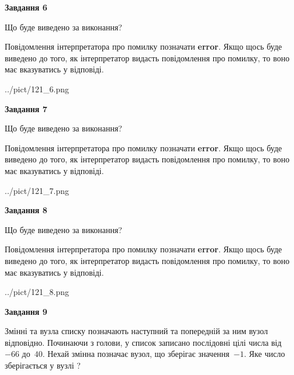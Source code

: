 \documentclass[12pt, ukrainian]{article}
\begin{document}
{\begin {large}
{\begin {center}\textbf{Завдання 6}\end {center}}\par
Що буде виведено за виконання?

Повідомлення інтерпретатора про помилку позначати \textbf{error}.
Якщо щось буде виведено до того, як інтерпретатор видасть повідомлення про помилку, 
то воно має вказуватись у відповіді. \par


\begin{center}
	{../pict/121_6.png}
\end{center}
\newpage

{\begin {center}\textbf{Завдання 7}\end {center}}\par
Що буде виведено за виконання?

Повідомлення інтерпретатора про помилку позначати \textbf{error}.
Якщо щось буде виведено до того, як інтерпретатор видасть повідомлення про помилку, 
то воно має вказуватись у відповіді. \par


\begin{center}
	{../pict/121_7.png}
\end{center}
\newpage

{\begin {center}\textbf{Завдання 8}\end {center}}\par
Що буде виведено за виконання?

Повідомлення інтерпретатора про помилку позначати \textbf{error}.
Якщо щось буде виведено до того, як інтерпретатор видасть повідомлення про помилку, 
то воно має вказуватись у відповіді. \par


\begin{center}
	{../pict/121_8.png}
\end{center}
\newpage

{\begin {center}\textbf{Завдання 9}\end {center}}\par
Змінні  та  вузла списку позначають наступний та попередній за ним вузол відповідно. Починаючи з голови, у список записано послідовні цілі числа від~$-66$ до~$40$. Нехай змінна  позначає вузол, що зберігає значення~$-1$.
Яке число зберігається у вузлі  ?\par
\newpage


\end{large}}
\end{document}
